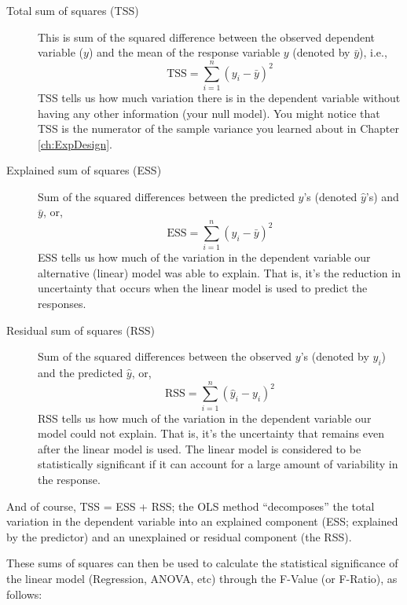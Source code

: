 \begin{description}

	\item[Total sum of squares (TSS)] This is sum of the squared 
	difference between the observed dependent variable ($y$) and the mean 
	of the response variable $y$ (denoted by $\bar{y}$), i.e., 
	$$\text{TSS} = \sum_{i=1}^{n}(y_i - \bar{y})^2$$ TSS tells us how 
	much variation there is in the dependent variable without having any 
	other information (your null model). You might notice that TSS is the 
	numerator of the sample variance you learned about in Chapter 
	\ref{ch:ExpDesign}.
  
	\item [Explained sum of squares (ESS)] Sum of the squared differences 
	between the predicted $y$'s (denoted $\hat{y}$'s) and $\bar{y}$, or, 
	$$\text{ESS} = \sum_{i=1}^{n} (\hat{y}_i - \bar{y})^2$$ ESS tells us 
	how much of the variation in the dependent variable our alternative 
	(linear) model was able to explain. That is, it's the reduction in 
	uncertainty that occurs when the linear model is used to predict the 
	responses.
	
	\item [Residual sum of squares (RSS)] Sum of the squared differences 
	between the observed $y$'s (denoted by $y_i$) and the predicted 
	$\hat{y}$, or, $$\text{RSS} = \sum_{i=1}^{n} (\hat{y}_i - y_i)^2$$ 
	RSS tells us how much of the variation in the dependent variable our 
	model could not explain. That is, it's the uncertainty that remains 
	even after the linear model is used. The linear model is considered 
	to be statistically significant if it can account for a large amount 
	of variability in the response.

\end{description} 

And of course, TSS = ESS + RSS; the OLS method ``decomposes'' the total variation in the dependent variable into an explained component (ESS; explained by the predictor) and an unexplained or residual component (the RSS). 

These sums of squares can then be used to calculate the statistical 
significance of the linear model (Regression, ANOVA, etc) through the 
F-Value (or F-Ratio), as follows: 

